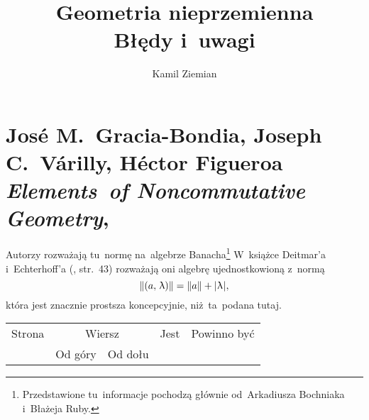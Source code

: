 \documentclass[a4paper,11pt]{article}
\title{Geometria nieprzemienna \\
  {\Large Błędy i~uwagi}}
\author{Kamil Ziemian}
\numberwithin{equation}{section}
\renewcommand{\lambda}{\uplambda}
\begin{document}





\maketitle %





\section{ %
  Jos\'{e} M.~Gracia-Bondia, Joseph C.~V\'{a}rilly, H\'{e}ctor Figueroa \\
  \textit{Elements~of Noncommutative Geometry},
  \cite{GraciaBondiaVarillyFigueroaNoncommutativeGeometry}}

\vspace{0em}



\vspace{0em}


\noindent
{} Autorzy rozważają tu~normę na~algebrze
Banacha\footnote{Przedstawione tu~informacje pochodzą głównie
  od~Arkadiusza Bochniaka i~Błażeja Ruby.} W~książce Deitmar’a
i~Echterhoff’a (\cite{DeitmarEcherhoffPrinciplesOfHarmonicAnalysis2009},
str.~43) rozważają oni algebrę ujednostkowioną z~normą
\begin{equation}
  \label{eq:GraciaBondiaEtAl--01}
  \Vert ( a,\, \lambda ) \Vert = \Vert a \Vert + \absOne{ \lambda },
\end{equation}
która jest znacznie prostsza koncepcyjnie, niż~ta~podana tutaj.







\begin{center}

  \begin{tabular}{|c|c|c|c|c|}
    \hline
    Strona & \multicolumn{2}{c|}{Wiersz} & Jest
                              & Powinno być \\ \cline{2-3}
    & Od góry & Od dołu & & \\
    \hline
    \hline
  \end{tabular}

\end{center}

\VerSpaceTwo













\printbibliography





\end{document}
